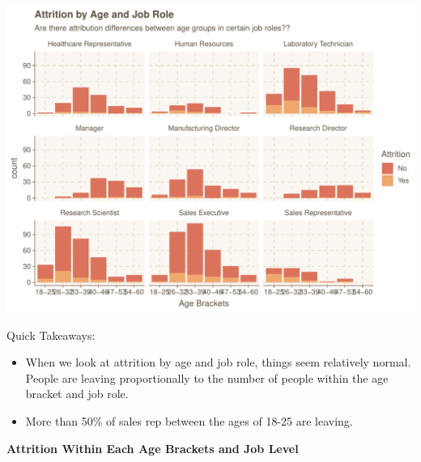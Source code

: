 \documentclass[
]{article}
\newenvironment{Shaded}{\begin{snugshade}}{\end{snugshade}}
\newcommand{\DataTypeTok}[1]{\textcolor[rgb]{0.13,0.29,0.53}{#1}}
\newcommand{\KeywordTok}[1]{\textcolor[rgb]{0.13,0.29,0.53}{\textbf{#1}}}
\newcommand{\NormalTok}[1]{#1}
\newcommand{\OperatorTok}[1]{\textcolor[rgb]{0.81,0.36,0.00}{\textbf{#1}}}
\newcommand{\StringTok}[1]{\textcolor[rgb]{0.31,0.60,0.02}{#1}}
\providecommand{\tightlist}{%
  \setlength{\itemsep}{0pt}\setlength{\parskip}{0pt}}
\begin{document}
\includegraphics{figures/Age and Job Role-1.pdf}

Quick Takeaways:

\begin{itemize}
\tightlist
\item
  When we look at attrition by age and job role, things seem relatively
  normal. People are leaving proportionally to the number of people
  within the age bracket and job role.
\item
  More than 50\% of sales rep between the ages of 18-25 are leaving.
\end{itemize}

\textbf{Attrition Within Each Age Brackets and Job Level}

\begin{Shaded}
\end{Shaded}
\end{document}
